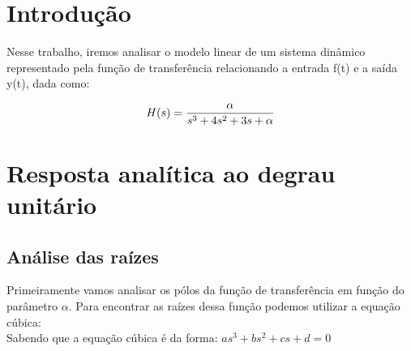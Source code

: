 \documentclass[a4paper,12pt,twoside]{article}
\begin{document}
\tableofcontents
\maketitle

\section{Introdução}

 Nesse trabalho, iremos analisar o modelo linear de um sistema dinâmico representado pela função de transferência relacionando a entrada f(t) e a saída y(t), dada como:

\begin{equation} \\ \label{eqfunction}
H(s)={\frac{\alpha}{s^3 +4s^2 +3s +\alpha}}
\end{equation}



\section{Resposta analítica ao degrau unitário}

\subsection{Análise das raízes}

Primeiramente vamos analisar os pólos da função de transferência em função do parâmetro $\alpha$. Para encontrar as raízes dessa função podemos utilizar a equação cúbica:\\
Sabendo que a equação cúbica é da forma:
$as^3 +bs^2 +cs + d = 0$
\end{document}

